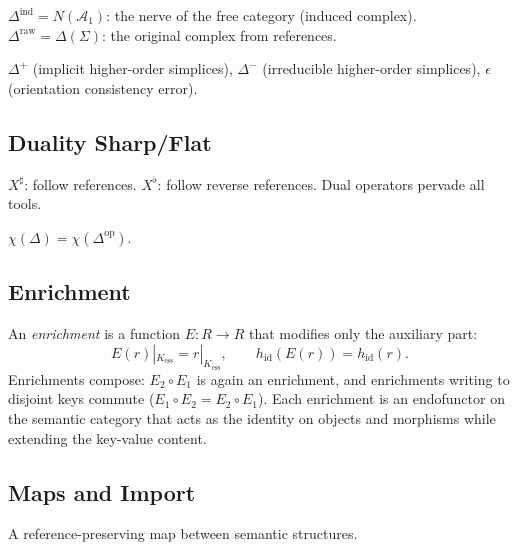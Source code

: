 \begin{definition}
$\Delta^{\mathrm{ind}} = N(\mathcal{A}_1)$: the nerve of the free category (induced complex). $\Delta^{\mathrm{raw}} = \Delta(\Sigma)$: the original complex from references.
\end{definition}

\begin{definition}
$\Delta^+$ (implicit higher-order simplices), $\Delta^-$ (irreducible higher-order simplices), $\epsilon$ (orientation consistency error).
\end{definition}

\subsection{Duality Sharp/Flat}

\begin{definition}
$X^\sharp$: follow references. $X^\flat$: follow reverse references. Dual operators pervade all tools.
\end{definition}

\begin{theorem}
$\chi(\Delta) = \chi(\Delta^{\mathrm{op}})$.
\end{theorem}

\subsection{Enrichment}

\begin{definition}[Enrichment]
\label{def:enrichment}
An \emph{enrichment} is a function $E : R \to R$ that modifies only the auxiliary part:
\[
E(r)|_{K_{\mathrm{ess}}} = r|_{K_{\mathrm{ess}}}, \qquad h_{\mathrm{id}}(E(r)) = h_{\mathrm{id}}(r).
\]
Enrichments compose: $E_2 \circ E_1$ is again an enrichment, and enrichments writing to disjoint keys commute ($E_1 \circ E_2 = E_2 \circ E_1$). Each enrichment is an endofunctor on the semantic category that acts as the identity on objects and morphisms while extending the key-value content.
\end{definition}

\subsection{Maps and Import}

\begin{definition}
A reference-preserving map between semantic structures.
\end{definition}

